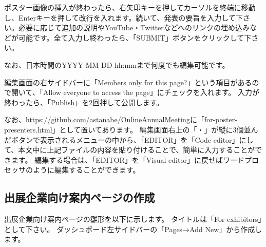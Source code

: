 \documentclass[titlepage,10pt,a4paper,uplatex]{jsbook}
\newenvironment{content}{\begin{shaded}\vspace{-1em}\raggedright\ttfamily\footnotesize\setlength{\baselineskip}{1.4em}}{\end{shaded}\vspace{-1em}}
\begin{document}
\begin{content}
ポスター画像の挿入が終わったら、右矢印キーを押してカーソルを終端に移動し、Enterキーを押して改行を入れます。続いて、発表の要旨を入力して下さい。必要に応じて追加の説明やYouTube・Twitterなどへのリンクの埋め込みなどが可能です。全て入力し終わったら、「SUBMIT」ボタンをクリックして下さい。

なお、日本時間のYYYY-MM-DD hh:mmまで何度でも編集可能です。
\end{content}

編集画面の右サイドバーに「Members only for this page?」という項目があるので開いて、「Allow everyone to access the page」にチェックを入れます。
入力が終わったら、「Publish」を2回押して公開します。

なお、\url{https://github.com/astanabe/OnlineAnnualMeeting}に「for-poster-presenters.html」として置いてあります。
編集画面右上の「・」が縦に3個並んだボタンで表示されるメニューの中から、「EDITOR」を「Code editor」にして、本文中に上記ファイルの内容を貼り付けることで、簡単に入力することができます。
編集する場合は、「EDITOR」を「Visual editor」に戻せばワードプロセッサのように編集することができます。

\subsection{出展企業向け案内ページの作成}

出展企業向け案内ページの雛形を以下に示します。
タイトルは「For exhibitors」として下さい。
ダッシュボード左サイドバーの「Pages→Add New」から作成します。
\end{document}
